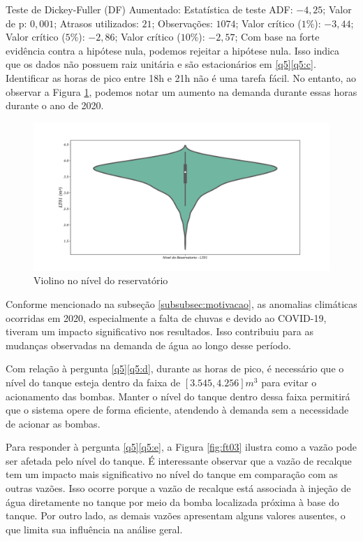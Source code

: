 Teste de Dickey-Fuller (DF) Aumentado:
Estatística de teste ADF: $-4,25$;
Valor de p: $0,001$;
Atrasos utilizados: $21$;
Observações: $1074$;
Valor crítico ($1\%$): $-3,44$;
Valor crítico ($5\%$): $-2,86$;
Valor crítico ($10\%$): $-2,57$;
Com base na forte evidência contra a hipótese nula, podemos rejeitar a hipótese nula. Isso indica que os dados não possuem raiz unitária e são estacionários em \ref{q5}\ref{q5:c}. Identificar as horas de pico entre 18h e 21h não é uma tarefa fácil. No entanto, ao observar a Figura \ref{fig:hist}, podemos notar um aumento na demanda durante essas horas durante o ano de 2020.
	
	
	\begin{figure}[H]
		\centering
		\caption{Violino no nível do reservatório}
		\label{fig:hist}
		\includegraphics[width=0.9\linewidth]{Resultados/Figuras/viol}
		

	\end{figure}
	
Conforme mencionado na subseção \ref{subsubsec:motivacao}, as anomalias climáticas ocorridas em 2020, especialmente a falta de chuvas e devido ao COVID-19, tiveram um impacto significativo nos resultados. Isso contribuiu para as mudanças observadas na demanda de água ao longo desse período.

Com relação à pergunta \ref{q5}\ref{q5:d}, durante as horas de pico, é necessário que o nível do tanque esteja dentro da faixa de $[3.545,4.256] m^3$ para evitar o acionamento das bombas. Manter o nível do tanque dentro dessa faixa permitirá que o sistema opere de forma eficiente, atendendo à demanda sem a necessidade de acionar as bombas.

Para responder à pergunta \ref{q5}\ref{q5:e}, a Figura \ref{fig:ft03} ilustra como a vazão pode ser afetada pelo nível do tanque. É interessante observar que a vazão de recalque tem um impacto mais significativo no nível do tanque em comparação com as outras vazões. Isso ocorre porque a vazão de recalque está associada à injeção de água diretamente no tanque por meio da bomba localizada próxima à base do tanque. Por outro lado, as demais vazões apresentam alguns valores ausentes, o que limita sua influência na análise geral.	
	
